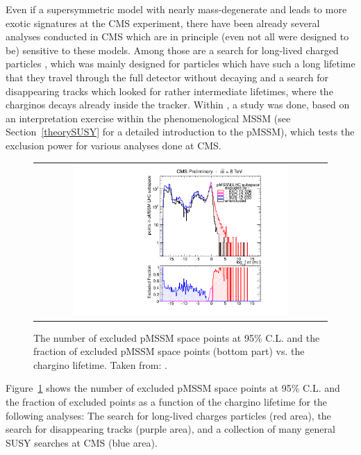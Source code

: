 Even if a supersymmetric model with nearly mass-degenerate \chipm and \chiO leads to more exotic signatures at the CMS experiment, there have been already several analyses conducted in CMS which are in principle (even not all were designed to be) sensitive to these models.
Among those are a search for long-lived charged particles \cite{bib:CMS:HSCP_8TeV}, which was mainly designed for particles which have such a long lifetime that they travel through the full detector without decaying and a search for disappearing tracks \cite{bib:CMS:DT_8TeV} which looked for rather intermediate lifetimes, where the charginos decays already inside the tracker. 
Within \cite{bib:CMS:DT_8TeV}, a study was done, based on an interpretation exercise \cite{bib:CMS:HSCPReinterpreation_PAS} within the phenomenological MSSM (see Section~\ref{theorySUSY} for a detailed introduction to the pMSSM), which tests the exclusion power for various analyses done at CMS.
\begin{figure}[!t]
  \centering 
  \begin{tabular}{c}
    \includegraphics[width=0.75\textwidth]{figures/analysis/pMSSM_vs_ctau.pdf}
  \end{tabular}
  \caption{The number of excluded pMSSM space points at 95\% C.L. and the fraction of excluded pMSSM space points (bottom part) vs. the chargino lifetime.
           Taken from: \cite{bib:pMSSMplot_source_from_DT}.}
  \label{fig:pMSSMplot}
\end{figure}
Figure~\ref{fig:pMSSMplot} shows the number of excluded pMSSM space points at 95\% C.L. and the fraction of excluded points as a function of the chargino lifetime for the following analyses: 
The search for long-lived charges particles  \cite{bib:CMS:HSCP_8TeV} (red area), 
the search for disappearing tracks  \cite{bib:CMS:DT_8TeV} (purple area),
and a collection of many general SUSY searches at CMS \cite{bib:CMS:pMSSMinterpretation_7TeV_PAS} (blue area).
